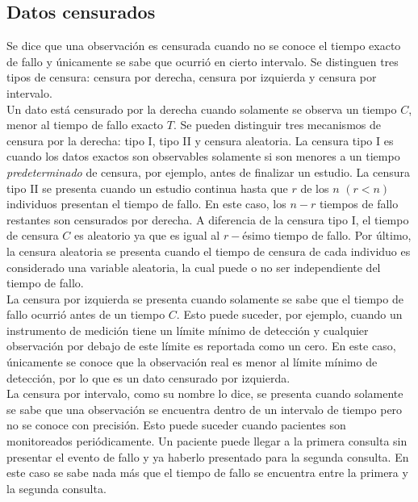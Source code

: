 \documentclass[11pt,a4paper]{article}
\begin{document}
\subsection{Datos censurados}

Se dice que una observación es censurada cuando no se conoce el tiempo exacto de fallo y únicamente se sabe que ocurrió en cierto intervalo. Se distinguen tres tipos de censura: censura por derecha, censura por izquierda y censura por intervalo.\\

Un dato está censurado por la derecha cuando solamente se observa un tiempo $C$, menor al tiempo de fallo exacto $T$. Se pueden distinguir tres mecanismos de censura por la derecha: tipo I, tipo II y censura aleatoria. La censura tipo I es cuando los datos exactos son observables solamente si son menores a un tiempo \textit{predeterminado} de censura, por ejemplo, antes de finalizar un estudio. La censura tipo II se presenta cuando un estudio continua hasta que $r$ de los $n$ $(r<n)$ individuos presentan el tiempo de fallo. En este caso, los $n-r$ tiempos de fallo restantes son censurados por derecha. A diferencia de la censura tipo I, el tiempo de censura $C$ es aleatorio ya que es igual al $r-$ésimo tiempo de fallo. Por último, la censura aleatoria se presenta cuando el tiempo de censura de cada individuo es considerado una variable aleatoria, la cual puede o no ser independiente del tiempo de fallo.\\

La censura por izquierda se presenta cuando solamente se sabe que el tiempo de fallo ocurrió antes de un tiempo $C$. Esto puede suceder, por ejemplo, cuando un instrumento de medición tiene un límite mínimo de detección y cualquier observación por debajo de este límite es reportada como un cero. En este caso, únicamente se conoce que la observación real es menor al límite mínimo de detección, por lo que es un dato censurado por izquierda.\\

La censura por intervalo, como su nombre lo dice, se presenta cuando solamente se sabe que una observación se encuentra dentro de un intervalo de tiempo pero no se conoce con precisión. Esto puede suceder cuando pacientes son monitoreados periódicamente. Un paciente puede llegar a la primera consulta sin presentar el evento de fallo y ya haberlo presentado para la segunda consulta. En este caso se sabe nada más que el tiempo de fallo se encuentra entre la primera y la segunda consulta.\\ 
\end{document}
